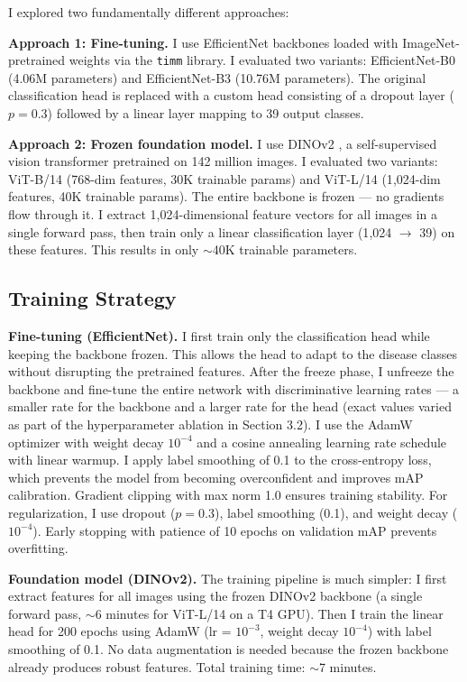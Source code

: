 \documentclass[11pt, a4paper]{article}
\begin{document}
I explored two fundamentally different approaches:

\textbf{Approach 1: Fine-tuning.} I use EfficientNet \cite{efficientnet} backbones loaded with ImageNet-pretrained weights via the \texttt{timm} library. I evaluated two variants: EfficientNet-B0 (4.06M parameters) and EfficientNet-B3 (10.76M parameters). The original classification head is replaced with a custom head consisting of a dropout layer ($p=0.3$) followed by a linear layer mapping to 39 output classes.

\textbf{Approach 2: Frozen foundation model.} I use DINOv2 \cite{dinov2}, a self-supervised vision transformer pretrained on 142 million images. I evaluated two variants: ViT-B/14 (768-dim features, 30K trainable params) and ViT-L/14 (1{,}024-dim features, 40K trainable params). The entire backbone is frozen --- no gradients flow through it. I extract 1{,}024-dimensional feature vectors for all images in a single forward pass, then train only a linear classification layer (1{,}024 $\rightarrow$ 39) on these features. This results in only $\sim$40K trainable parameters.

\subsection{Training Strategy}

\textbf{Fine-tuning (EfficientNet).} I first train only the classification head while keeping the backbone frozen. This allows the head to adapt to the disease classes without disrupting the pretrained features. After the freeze phase, I unfreeze the backbone and fine-tune the entire network with discriminative learning rates --- a smaller rate for the backbone and a larger rate for the head (exact values varied as part of the hyperparameter ablation in Section 3.2). I use the AdamW optimizer with weight decay $10^{-4}$ and a cosine annealing learning rate schedule with linear warmup. I apply label smoothing of 0.1 to the cross-entropy loss, which prevents the model from becoming overconfident and improves mAP calibration. Gradient clipping with max norm 1.0 ensures training stability. For regularization, I use dropout ($p=0.3$), label smoothing (0.1), and weight decay ($10^{-4}$). Early stopping with patience of 10 epochs on validation mAP prevents overfitting.

\textbf{Foundation model (DINOv2).} The training pipeline is much simpler: I first extract features for all images using the frozen DINOv2 backbone (a single forward pass, $\sim$6 minutes for ViT-L/14 on a T4 GPU). Then I train the linear head for 200 epochs using AdamW (lr = $10^{-3}$, weight decay $10^{-4}$) with label smoothing of 0.1. No data augmentation is needed because the frozen backbone already produces robust features. Total training time: $\sim$7 minutes.
\end{document}
